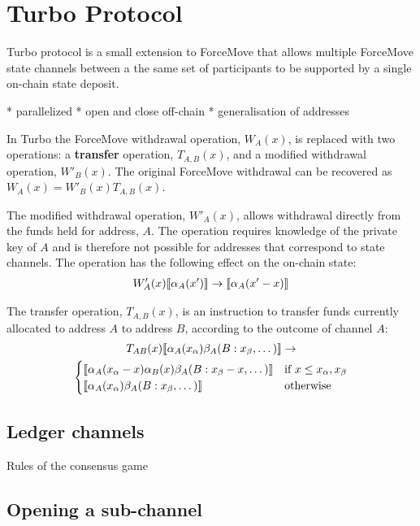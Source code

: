 \section{Turbo Protocol}

Turbo protocol is a small extension to ForceMove that allows multiple ForceMove state
channels between a the same set of participants to be supported by a single on-chain
state deposit.

* parallelized
* open and close off-chain
* generalisation of addresses

In Turbo the ForceMove withdrawal operation, $W_A(x)$, is replaced with two operations: a
\textbf{transfer} operation, $T_{A,B}(x)$, and a modified withdrawal operation, $W'_B(x)$.
The original ForceMove withdrawal can be recovered as $W_A(x) = W'_B(x)T_{A,B}(x)$.

The modified withdrawal operation, $W'_A(x)$, allows withdrawal directly from the funds
held for address, $A$. The operation requires knowledge of the private key of $A$ and is
therefore not possible for addresses that correspond to state channels. The operation has
the following effect on the on-chain state:
\begin{align*}
W'_A(x) \llbracket \alpha_A(x') \rrbracket \rightarrow \llbracket \alpha_A(x'-x) \rrbracket
\end{align*}

The transfer operation, $T_{A,B}(x)$, is an instruction to transfer funds currently allocated
to address $A$ to address $B$, according to the outcome of channel $A$:
\begin{multline*}
T_{AB}(x) \llbracket \alpha_A(x_\alpha)\beta_A(B:x_\beta, \dots) \rrbracket \rightarrow \\
  \begin{cases}
      \llbracket \alpha_A(x_\alpha - x)\alpha_B(x)\beta_A(B:x_\beta - x, \dots) \rrbracket & 
      \text{if } x \leq x_\alpha, x_\beta \\
      \llbracket \alpha_A(x_\alpha)\beta_A(B:x_\beta, \dots) \rrbracket &
      \text{otherwise}
  \end{cases}
\end{multline*}

\subsection{Ledger channels}

Rules of the consensus game

\subsection{Opening a sub-channel}

